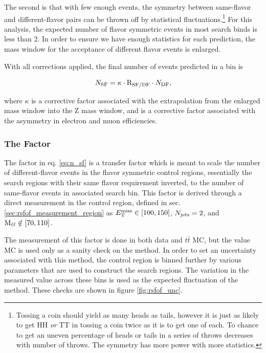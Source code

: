     The second is that with few enough events, the symmetry between same-flavor and different-flavor pairs can be thrown off by statistical fluctuations.\footnote{Tossing a coin should yield as many heads as tails, however it is just as likely to get HH \emph{or} TT in tossing a coin twice as it is to get one of each. To chance to get an uneven percentage of heads or tails in a series of throws decreases with number of throws. The symmetry has more power with more statistics.} For this analysis, the expected number of flavor symmetric events in most search binds is less than 2. In order to ensure we have enough statistics for each prediction, the mass window for the acceptance of different flavor events is enlarged.

    With all corrections applied, the final number of events predicted in a \MET bin is 

    \begin{equation}
      N_{\text{SF}} = \kappa \cdot \mathrm{R_{SF/DF}} \cdot N_{\text{DF}}, \label{eq:n_sf}
    \end{equation}

    where $\kappa$ is a corrective factor associated with the extrapolation from the enlarged mass window into the Z mass window, and \rsfof is a corrective factor associated with the asymmetry in electron and muon efficiencies.

    \subsubsection{The \rsfof Factor}

      The factor \rsfof in eq. \ref{eq:n_sf} is a transfer factor which is meant to scale the number of different-flavor events in the flavor symmetric control regions, essentially the search regions with their same flavor requirement inverted, to the number of same-flavor events in associated search bin. This factor is derived through a direct measurement in the \rsfof control region, defined in sec. \ref{sec:rsfof_measurement_region} as $E_{\mathrm{T}}^{\text{miss}} \in [100,150]$, $N_{\mathrm{jets}} = 2$, and $\text{M}_{\ell\ell} \notin [70,110]$. 

      The measurement of this factor is done in both data and $t\bar{t}$ MC, but the value MC is used only as a sanity check on the method. In order to set an uncertainty associated with this method, the \rsfof control region is binned further by various parameters that are used to construct the search regions. The variation in the measured value across these bins is used as the expected fluctuation of the method. These checks are shown in figure \ref{fig:rsfof_unc}.

